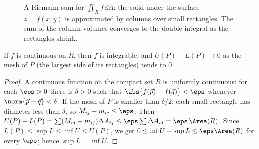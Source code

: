 \begin{figure}[ht]
\centering
{}
\caption{A Riemann sum for $\iint_Rf\,\dd A$: the solid under the surface $z=f(x,y)$ is approximated by columns over small rectangles. The sum of the column volumes converges to the double integral as the rectangles shrink.}
\label{fig:riemann}
\end{figure}

\begin{theorem}\label{thm:contint}
If $f$ is continuous on $R$, then $f$ is integrable, and $U(P)-L(P)\to0$ as the mesh of $P$ (the largest side of its rectangles) tends to $0$.
\end{theorem}

\begin{proof}
A continuous function on the compact set $R$ is uniformly continuous: for each $\eps>0$ there is $\delta>0$ such that $\abs{f(\vec p)-f(\vec q)}<\eps$ whenever $\norm{\vec p-\vec q}<\delta$. If the mesh of $P$ is smaller than $\delta/2$, each small rectangle has diameter less than $\delta$, so $M_{ij}-m_{ij}\le\eps$. Then $U(P)-L(P)=\sum(M_{ij}-m_{ij})\Delta A_{ij}\le\eps\sum\Delta A_{ij}=\eps\,\Area(R)$. Since $L(P)\le\sup L\le\inf U\le U(P)$, we get $0\le\inf U-\sup L\le\eps\Area(R)$ for every $\eps$; hence $\sup L=\inf U$.
\end{proof}

